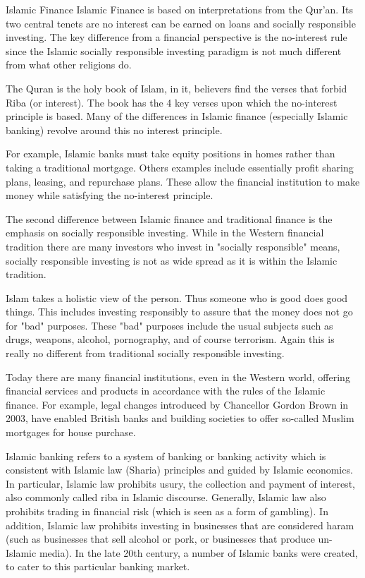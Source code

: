 
Islamic Finance
Islamic Finance is based on interpretations from the Qur'an. Its two central tenets are no interest can be earned on loans and socially responsible investing. The key difference from a financial perspective is the no-interest rule since the Islamic socially responsible investing paradigm is not much different from what other religions do.

The Quran is the holy book of Islam, in it, believers find the verses that forbid Riba (or interest). The book has the 4 key verses upon which the no-interest principle is based. Many of the differences in Islamic finance (especially Islamic banking) revolve around this no interest principle.

For example, Islamic banks must take equity positions in homes rather than taking a traditional mortgage. Others examples include essentially profit sharing plans, leasing, and repurchase plans. These allow the financial institution to make money while satisfying the no-interest principle.

The second difference between Islamic finance and traditional finance is the emphasis on socially responsible investing. While in the Western financial tradition there are many investors who invest in "socially responsible" means, socially responsible investing is not as wide spread as it is within the Islamic tradition.

Islam takes a holistic view of the person. Thus someone who is good does good things. This includes investing responsibly to assure that the money does not go for "bad" purposes. These "bad" purposes include the usual subjects such as drugs, weapons, alcohol, pornography, and of course terrorism. Again this is really no different from traditional socially responsible investing.

Today there are many financial institutions, even in the Western world, offering financial services and products in accordance with the rules of the Islamic finance. For example, legal changes introduced by Chancellor Gordon Brown in 2003, have enabled British banks and building societies to offer so-called Muslim mortgages for house purchase.

Islamic banking refers to a system of banking or banking activity which is consistent with Islamic law (Sharia) principles and guided by Islamic economics. In particular, Islamic law prohibits usury, the collection and payment of interest, also commonly called riba in Islamic discourse. Generally, Islamic law also prohibits trading in financial risk (which is seen as a form of gambling). In addition, Islamic law prohibits investing in businesses that are considered haram (such as businesses that sell alcohol or pork, or businesses that produce un-Islamic media). In the late 20th century, a number of Islamic banks were created, to cater to this particular banking market.

